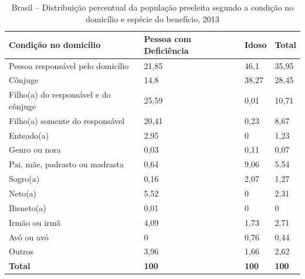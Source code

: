 \documentclass[
	12pt,				%
	openright,			%
	twoside,			%
	a4paper,			%
	english,			%
	french,				%
	spanish,			%
	brazil				%
	]{abntex2}
\begin{document}
\begin{table}[H]
	\footnotesize
	\centering
	\caption{Brasil -- Distribuição percentual da população preeleita segundo a condição no domicílio e espécie do benefício, 2013}
	\label{tab_prop_byc004_preeleito}
	\begin{tabular}{@{}llp{3cm}p{3cm}@{}}
		\toprule
		\textbf{Condição no domicílio}       & \textbf{Pessoa com Deficiência} & \textbf{Idoso} & \textbf{Total} \\ \midrule
		Pessoa responsável pelo domicílio    & 21,85                           & 46,1           & 35,95          \\
		Cônjuge                              & 14,8                            & 38,27          & 28,45          \\
		Filho(a) do responsável e do cônjuge & 25,59                           & 0,01           & 10,71          \\
		Filho(a) somente do responsável      & 20,41                           & 0,23           & 8,67           \\
		Enteado(a)                           & 2,95                            & 0              & 1,23           \\
		Genro ou nora                        & 0,03                            & 0,11           & 0,07           \\
		Pai, mãe, padrasto ou madrasta       & 0,64                            & 9,06           & 5,54           \\
		Sogro(a)                             & 0,16                            & 2,07           & 1,27           \\
		Neto(a)                              & 5,52                            & 0              & 2,31           \\
		Bisneto(a)                           & 0,01                            & 0              & 0              \\
		Irmão ou irmã                        & 4,09                            & 1,73           & 2,71           \\
		Avô ou avó                           & 0                               & 0,76           & 0,44           \\
		Outros                               & 3,96                            & 1,66           & 2,62           \\ \midrule
		\textbf{Total}                       & \textbf{100}                    & \textbf{100}   & \textbf{100}   \\ \bottomrule
	\end{tabular}
\end{table}
\end{document}
